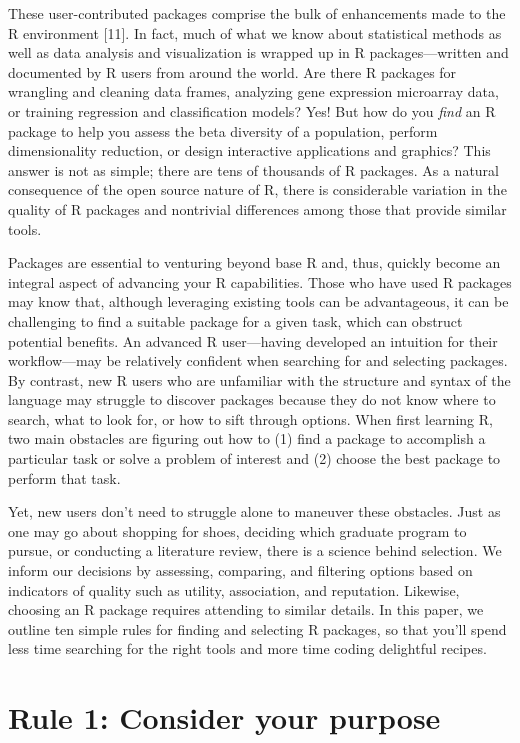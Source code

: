 \documentclass[10pt,letterpaper]{article}
\begin{document}
These user-contributed packages comprise the bulk of enhancements made
to the R environment {[}11{]}. In fact, much of what we know about
statistical methods as well as data analysis and visualization is
wrapped up in R packages---written and documented by R users from around
the world. Are there R packages for wrangling and cleaning data frames,
analyzing gene expression microarray data, or training regression and
classification models? Yes! But how do you \emph{find} an R package to
help you assess the beta diversity of a population, perform
dimensionality reduction, or design interactive applications and
graphics? This answer is not as simple; there are tens of thousands of R
packages. As a natural consequence of the open source nature of R, there
is considerable variation in the quality of R packages and nontrivial
differences among those that provide similar tools.

Packages are essential to venturing beyond base R and, thus, quickly
become an integral aspect of advancing your R capabilities. Those who
have used R packages may know that, although leveraging existing tools
can be advantageous, it can be challenging to find a suitable package
for a given task, which can obstruct potential benefits. An advanced R
user---having developed an intuition for their workflow---may be
relatively confident when searching for and selecting packages. By
contrast, new R users who are unfamiliar with the structure and syntax
of the language may struggle to discover packages because they do not
know where to search, what to look for, or how to sift through options.
When first learning R, two main obstacles are figuring out how to (1)
find a package to accomplish a particular task or solve a problem of
interest and (2) choose the best package to perform that task.

Yet, new users don't need to struggle alone to maneuver these obstacles.
Just as one may go about shopping for shoes, deciding which graduate
program to pursue, or conducting a literature review, there is a science
behind selection. We inform our decisions by assessing, comparing, and
filtering options based on indicators of quality such as utility,
association, and reputation. Likewise, choosing an R package requires
attending to similar details. In this paper, we outline ten simple rules
for finding and selecting R packages, so that you'll spend less time
searching for the right tools and more time coding delightful recipes.

\hypertarget{rule-1-consider-your-purpose}{%
\section{Rule 1: Consider your
purpose}\label{rule-1-consider-your-purpose}}
\end{document}
